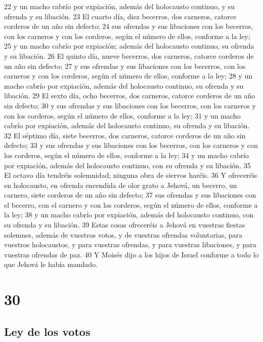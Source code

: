 22 y un macho cabrío por expiación, además del holocausto continuo, y su ofrenda y su libación.
23 El cuarto día, diez becerros, dos carneros, catorce corderos de un año sin defecto;
24 sus ofrendas y sus libaciones con los becerros, con los carneros y con los corderos, según el número de ellos, conforme a la ley;
25 y un macho cabrío por expiación; además del holocausto continuo, su ofrenda y su libación.
26 El quinto día, nueve becerros, dos carneros, catorce corderos de un año sin defecto;
27 y sus ofrendas y sus libaciones con los becerros, con los carneros y con los corderos, según el número de ellos, conforme a la ley;
28 y un macho cabrío por expiación, además del holocausto continuo, su ofrenda y su libación.
29 El sexto día, ocho becerros, dos carneros, catorce corderos de un año sin defecto;
30 y sus ofrendas y sus libaciones con los becerros, con los carneros y con los corderos, según el número de ellos, conforme a la ley;
31 y un macho cabrío por expiación, además del holocausto continuo, su ofrenda y su libación.
32 El séptimo día, siete becerros, dos carneros, catorce corderos de un año sin defecto;
33 y sus ofrendas y sus libaciones con los becerros, con los carneros y con los corderos, según el número de ellos, conforme a la ley;
34 y un macho cabrío por expiación, además del holocausto continuo, con su ofrenda y su libación.
35 El octavo día tendréis solemnidad; ninguna obra de siervos haréis.
36 Y ofreceréis en holocausto, en ofrenda encendida de olor grato a Jehová, un becerro, un carnero, siete corderos de un año sin defecto;
37 sus ofrendas y sus libaciones con el becerro, con el carnero y con los corderos, según el número de ellos, conforme a la ley;
38 y un macho cabrío por expiación, además del holocausto continuo, con su ofrenda y su libación.
39 Estas cosas ofreceréis a Jehová en vuestras fiestas solemnes, además de vuestros votos, y de vuestras ofrendas voluntarias, para vuestros holocaustos, y para vuestras ofrendas, y para vuestras libaciones, y para vuestras ofrendas de paz.
40 Y Moisés dijo a los hijos de Israel conforme a todo lo que Jehová le había mandado.

\chapter{30}

\section*{Ley de los votos}


